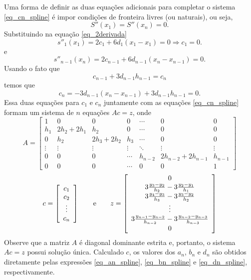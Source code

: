 Uma forma de definir as duas equações adicionais para completar o sistema \eqref{eq_cn_spline} é impor condições de fronteira livres (ou naturais), ou seja,
\begin{equation}
S''(x_1)=S''(x_n)=0.
\end{equation}
Substituindo na equação \eqref{eq_2derivada}
$$
s''_1(x_1)=2c_1+6d_1(x_1-x_1)=0 \Longrightarrow c_1=0.
$$
e
$$
s''_{n-1}(x_n)=2c_{n-1}+6d_{n-1}(x_{n}-x_{n-1})=0 .
$$
Usando o fato que
$$
c_{n-1}+3d_{n-1}h_{n-1}=c_{n}
$$
temos que
$$
c_n=-3d_{n-1}(x_{n}-x_{n-1})+3d_{n-1}h_{n-1}=0.
$$
Essa duas equações para $c_1$ e $c_n$ juntamente com as equações \eqref{eq_cn_spline} formam um sistema de $n$ equações $Ac=z$, onde
\begin{equation}
A=\left[\begin{array}{ccccccc}
1 &0&0&0 &\cdots&0&0\\
h_1&2h_2+2h_{1}&h_2&0&\cdots&0&0\\
0&h_2&2h_3+2h_{2}&h_3&\cdots&0&0\\
\vdots&\vdots&\vdots&\vdots&\ddots&\vdots&\vdots\\
0&0&0&\cdots&h_{n-2} & 2h_{n-2}+2h_{n-1}&h_{n-1}\\
0&0&0&\cdots &0&0&1
\end{array}\right]  
\end{equation}
\begin{equation}
c = \left[\begin{array}{c}
c_1\\
c_2\\
\vdots\\
c_n
\end{array}\right]\qquad \hbox{e}\qquad
z = \left[\begin{array}{c}
0\\
3\frac{y_{3}-y_2}{h_2}-3\frac{y_{2}-y_{1}}{h_{1}}\\
3\frac{y_{4}-y_3}{h_3}-3\frac{y_{3}-y_{2}}{h_{2}}\\
\vdots\\
3\frac{y_{n-1}-y_{n-2}}{h_{n-2}}-3\frac{y_{n-2}-y_{n-3}}{h_{n-3}}\\
0
\end{array}\right]
\end{equation}
Observe que a matriz $A$ é diagonal dominante estrita e, portanto, o sistema $Ac=z$ possui solução única. Calculado $c$, os valores dos $a_n$, $b_n$ e $d_n$ são obtidos diretamente pelas expressões \eqref{eq_an_spline}, \eqref{eq_bn_spline} e \eqref{eq_dn_spline}, respectivamente.

